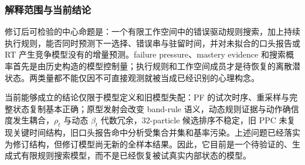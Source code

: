 \subsubsection{解释范围与当前结论}

修订后可检验的中心命题是：一个有限工作空间中的错误驱动规则搜索，加上持续执行规则，能否同时预测下一选择、错误串与驻留时间，并对未拟合的口头报告或 RT 产生竞争模型没有的增量预测。failure pressure、mastery evidence 和搜索概率首先是由历史构造的模型控制量；执行规则和工作空间成员才是待恢复的离散潜状态。两类量都不能仅因不可直接观测就被当成已经识别的心理构念。

当前能够成立的结论仅限于模型定义和旧模型失配：PF 的试次时序、重采样与完整状态复制基本正确；原型发射会改变 band-rule 语义，动态规则证据与动作确信度发生耦合，$\rho_t$ 与动态 $\beta_t$ 代数冗余，32-particle 候选排序不稳定，旧 PPC 未复现关键时间结构，旧口头报告命中分析受集合并集和基率污染。上述问题已经落实为修订结构，但修订模型尚无新的全样本结果。因此，它目前是一个待验证的、生成式有限规则搜索模型，而不是已经恢复被试真实内部状态的模型。

